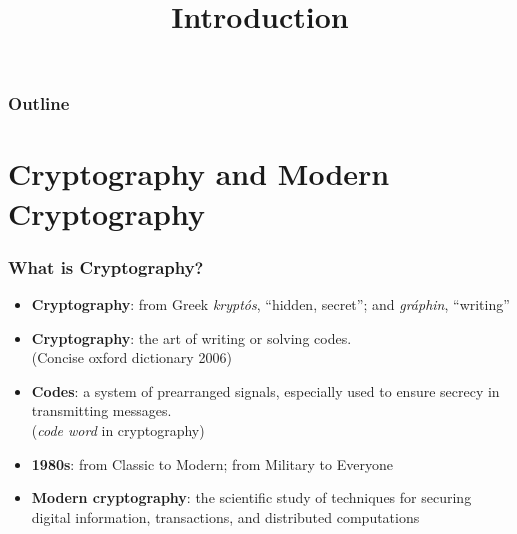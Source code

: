 

\title{Introduction}


\maketitle
\begin{frame}
\frametitle{Outline}
\tableofcontents
\end{frame}
\section{Cryptography and Modern Cryptography}
\begin{frame}\frametitle{What is Cryptography?}
\begin{itemize}
\item \textbf{Cryptography}: from Greek \emph{krypt\'os}, ``hidden, secret''; and \emph{gr\'{a}phin}, ``writing''
\item \textbf{Cryptography}: the art of writing or solving codes.\\ (Concise oxford dictionary 2006)
\item \textbf{Codes}: a system of prearranged signals, especially used to ensure secrecy in transmitting messages. \\ (\emph{code word} in cryptography)
\item \textbf{1980s}: from Classic to Modern; from Military to Everyone
\item \textbf{Modern cryptography}: the scientific study of techniques for securing digital information, transactions, and distributed computations
\end{itemize}
\end{frame}
